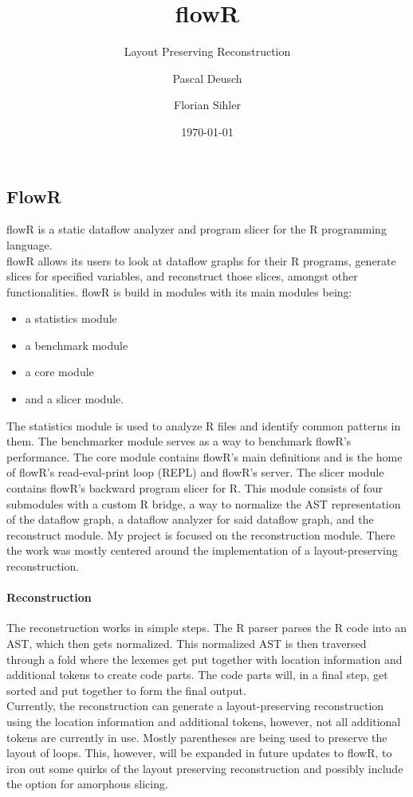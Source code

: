 \documentclass[a3paper, portrait, english, default]{uulm-cs-poster}
\title{flowR}
\subtitle{Layout Preserving Reconstruction}
\author{Pascal Deusch\and Florian Sihler}
\institute{Institut für Software Engineering und Programmiersprachen}
\date{\today}
\begin{document}
\maketitle
\begin{multicols}{2}
\section*{FlowR}
	flowR is a static dataflow analyzer and program slicer for the R programming language.\\%
	flowR allows its users to look at dataflow graphs for their R programs, generate slices for specified variables, and reconstruct those slices, amongst other functionalities.
	flowR is build in modules with its main modules being:
   \begin{itemize}
      \item a statistics module
      \item a benchmark module
	  \item a core module
      \item and a slicer module.
   \end{itemize}
The statistics module is used to analyze R files and identify common patterns in them. The benchmarker module serves as a way to benchmark flowR's performance.
The core module contains flowR's main definitions and is the home of flowR's read-eval-print loop (REPL) and flowR's server. The slicer module contains flowR's backward program slicer for R. This module consists of four submodules with a custom R bridge, a way to normalize the AST representation of the dataflow graph, a dataflow analyzer for said dataflow graph, and the reconstruct module.
My project is focused on the reconstruction module. There the work was mostly centered around the implementation of a layout-preserving reconstruction.
\paragraph{Reconstruction}
The reconstruction works in simple steps. The R parser parses the R code into an AST, which then gets normalized. This normalized AST is then traversed through a fold where the lexemes get put together with location information and additional tokens to create code parts. The code parts will, in a final step, get sorted and put together to form the final output.\\
Currently, the reconstruction can generate a layout-preserving reconstruction using the location information and additional tokens, however, not all additional tokens are currently in use. Mostly parentheses are being used to preserve the layout of loops. This, however, will be expanded in future updates to flowR, to iron out some quirks of the layout preserving reconstruction and possibly include the option for amorphous slicing.\\
\columnbreak

\end{multicols}
\end{document}

